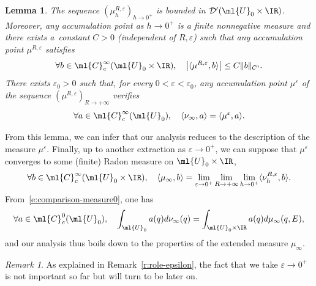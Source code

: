 \documentclass[JEP,XML,SOM,Unicode, NoEqCountersInSection,published]{cedram}
\theoremstyle{plain}
\newtheorem{lemm}[theo]{Lemma}
\theoremstyle{definition}
\theoremstyle{remark}
\newtheorem{rema}[theo]{Remark}
\begin{document}
\begin{lemm}\label{l:mu_epsilon} The sequence $(\mu_{h}^{R,\varepsilon})_{h\to 0^+}$ is bounded in $\mathcal{D}^\prime(\ml{U}_0\times\IR)$. Moreover, any accumulation point as $h\to 0^+$ is a finite nonnegative measure and there exists a~constant $C>0$ (independent of $R,\varepsilon$) such that any accumulation point $\mu^{R,\varepsilon}$ satisfies
\[
\forall b\in\ml{C}_c^{\infty}(\ml{U}_0\times\IR),\quad \left|\langle\mu^{R,\varepsilon},b\rangle\right|\leq C \|b\|_{\mathcal{C}^0}.
\]
There exists $\varepsilon_0>0$ such that, for every $0<\varepsilon<\varepsilon_0$, any accumulation point $\mu^{\varepsilon}$ of the sequence $(\mu^{R,\varepsilon})_{R\to +\infty}$ verifies
\begin{equation}%
\forall a\in\ml{C}^{\infty}_c(\ml{U}_0),\quad\langle\nu_\infty,a\rangle=\langle\mu^{\varepsilon},a\rangle.\end{equation}
\end{lemm}

From this lemma, we can infer that our analysis reduces to the description of the measure $\mu^{\varepsilon}$. Finally, up to another extraction as $\varepsilon\to 0^+$, we can suppose that $\mu^{\varepsilon}$ converges to some (finite) Radon measure on $\ml{U}_0\times\IR$, \ie
\begin{equation}\label{e:full-wigner-H1}
\forall b\in\ml{C}_c^{\infty}(\ml{U}_0\times\IR),\quad \langle \mu_\infty,b\rangle=\lim_{\varepsilon\to 0^+}\lim_{R\to+\infty}\lim_{h\to 0^+}\langle\nu_h^{R,\varepsilon},b\rangle.
\end{equation}
From~\eqref{e:comparison-measure0}, one has
\begin{equation}%
\forall a\in\ml{C}^0_c(\ml{U}_0),\quad \int_{\ml{U}_0}a(q)d\nu_{\infty}(q)=\int_{\ml{U}_0\times\IR}a(q)d\mu_{\infty}(q,E),
\end{equation}
and our analysis thus boils down to the properties of the extended measure $\mu_\infty$.
\begin{rema}
As explained in Remark~\ref{r:role-epsilon}, the fact that we take $\varepsilon\to 0^+$ is not important so far but will turn to be later on.
\end{rema}
\end{document}
